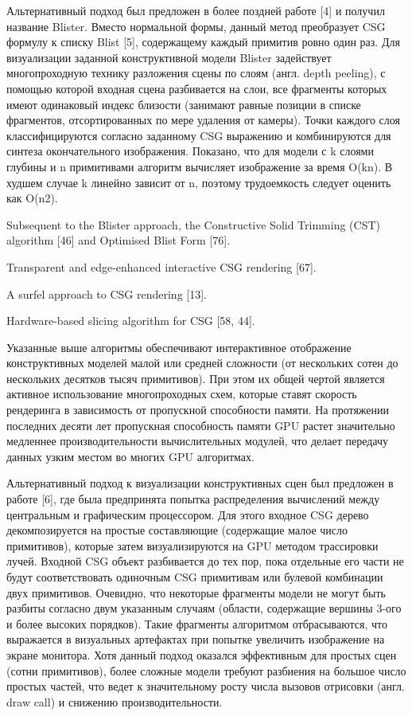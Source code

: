 Альтернативный подход был предложен в более поздней работе [4] и получил название Blister. Вместо нормальной формы, данный метод преобразует CSG формулу к списку Blist [5], содержащему каждый примитив ровно один раз. Для визуализации заданной конструктивной модели Blister задействует многопроходную технику разложения сцены по слоям (англ. depth peeling), с помощью которой входная сцена разбивается на слои, все фрагменты которых имеют одинаковый индекс близости (занимают равные позиции в списке фрагментов, отсортированных по мере удаления от камеры). Точки каждого слоя классифицируются согласно заданному CSG выражению и комбинируются для синтеза окончательного изображения. Показано, что для модели с k слоями глубины и n примитивами алгоритм вычисляет изображение за время O(kn). В худшем случае k линейно зависит от n, поэтому трудоемкость следует оценить как O(n2).

Subsequent to the Blister approach, the Constructive Solid Trimming (CST) algorithm [46] and Optimised Blist Form [76].

Transparent and edge-enhanced interactive CSG rendering [67].

A surfel approach to CSG rendering [13].

Hardware-based slicing algorithm for CSG [58, 44].

Указанные выше алгоритмы обеспечивают интерактивное отображение конструктивных моделей малой или средней  сложности (от нескольких сотен до нескольких десятков тысяч примитивов). При этом их общей чертой является активное использование многопроходных схем, которые ставят скорость рендеринга в зависимость от пропускной способности памяти. На протяжении последних десяти лет пропускная способность памяти GPU растет значительно медленнее производительности вычислительных модулей,  что делает передачу данных узким местом во многих GPU алгоритмах.

Альтернативный подход к визуализации конструктивных сцен был предложен в работе [6], где была предпринята попытка распределения вычислений между центральным и графическим процессором. Для этого входное CSG дерево декомпозируется на простые составляющие (содержащие малое число примитивов), которые затем визуализируются на GPU методом трассировки лучей. Входной CSG объект разбивается до тех пор, пока отдельные его части не будут соответствовать одиночным CSG примитивам или булевой  комбинации двух примитивов. Очевидно, что некоторые фрагменты модели не могут быть разбиты согласно двум указанным случаям (области, содержащие вершины 3-ого и более высоких порядков). Такие фрагменты алгоритмом отбрасываются, что выражается в визуальных артефактах при попытке увеличить изображение на экране монитора. Хотя данный подход оказался эффективным для простых сцен (сотни примитивов), более сложные модели требуют разбиения на большое число простых частей, что ведет к значительному росту числа вызовов отрисовки (англ. draw call) и снижению производительности.

